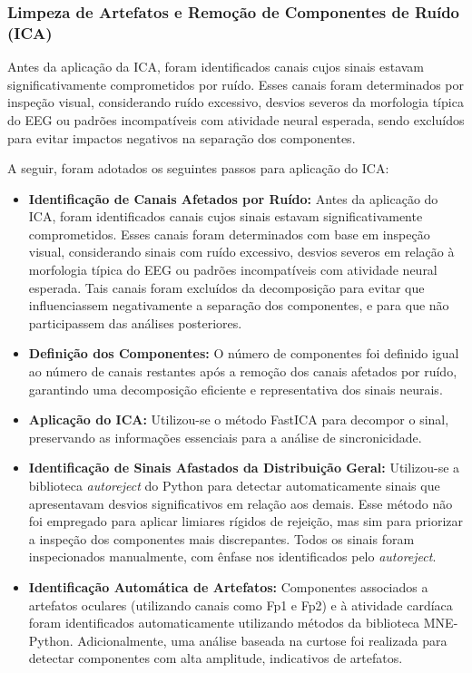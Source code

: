 \clearpage
\subsubsection{Limpeza de Artefatos e Remoção de Componentes de Ruído (ICA)}
Antes da aplicação da ICA, foram identificados canais cujos sinais estavam significativamente comprometidos por ruído. Esses canais foram determinados por inspeção visual, considerando ruído excessivo, desvios severos da morfologia típica do EEG ou padrões incompatíveis com atividade neural esperada, sendo excluídos para evitar impactos negativos na separação dos componentes.

A seguir, foram adotados os seguintes passos para aplicação do ICA:
\begin{itemize}
    \item \textbf{Identificação de Canais Afetados por Ruído:} Antes da aplicação do ICA, foram identificados canais cujos sinais estavam significativamente comprometidos. Esses canais foram determinados com base em inspeção visual, considerando sinais com ruído excessivo, desvios severos em relação à morfologia típica do EEG ou padrões incompatíveis com atividade neural esperada. Tais canais foram excluídos da decomposição para evitar que influenciassem negativamente a separação dos componentes, e para que não participassem das análises posteriores.
    \item \textbf{Definição dos Componentes:} O número de componentes foi definido igual ao número de canais restantes após a remoção dos canais afetados por ruído, garantindo uma decomposição eficiente e representativa dos sinais neurais. 
    \item \textbf{Aplicação do ICA:} Utilizou-se o método FastICA para decompor o sinal, preservando as informações essenciais para a análise de sincronicidade. 
    \item \textbf{Identificação de Sinais Afastados da Distribuição Geral:} Utilizou-se a biblioteca \textit{autoreject} do Python para detectar automaticamente sinais que apresentavam desvios significativos em relação aos demais. Esse método não foi empregado para aplicar limiares rígidos de rejeição, mas sim para priorizar a inspeção dos componentes mais discrepantes. Todos os sinais foram inspecionados manualmente, com ênfase nos identificados pelo \textit{autoreject}.
    \item \textbf{Identificação Automática de Artefatos:} Componentes associados a artefatos oculares (utilizando canais como Fp1 e Fp2) e à atividade cardíaca foram identificados automaticamente utilizando métodos da biblioteca MNE-Python. Adicionalmente, uma análise baseada na curtose foi realizada para detectar componentes com alta amplitude, indicativos de artefatos. 

\end{itemize}
